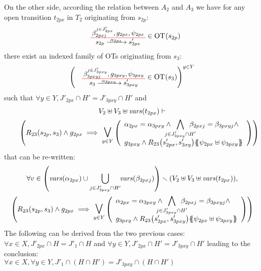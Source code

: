 \documentclass[runningheads]{llncs}
\begin{document}
\begin{enumerate}
On the other side, according the relation between $A_2$ and $A_3$ we have for any open transition $t_{2px}$ in $T_2$ originating from $s_{2p}$:
\begin{align*}
\OTx{2p}{x}{2px}{2px} \in \fOT{s_{2p}}
\end{align*}
there exist an indexed family of OTs originating from $s_3$: 
\begin{align*}
\mpar{\OTx{3}{pxy}{3pxy}{3pxy} \in \fOT{s_3}}^{y \in Y} 
\end{align*}
such that $\forall y \in Y, J'_{2px} \cap H' = J'_{3pxy} \cap H'$ and
\begin{multline*}
\everymath{\displaystyle}
V_2 \uplus V_3 \uplus \fvars{t_{2px}} \vdash\\\hspace{2em} \mpar{R_{23}\mpar{s_{2p}, s_{3}} \wedge g_{2px} \implies \operatorname*{\bigsymb{\bigvee}}_{y \in Y} \mpar{\everymath{\displaystyle}
\begin{array}{l}
			 \alpha_{2px}=\alpha_{3pxy} \wedge \bigwedge_\subbox{j \in J'_{3pxy} \cap H'} \beta_{2pxj}=\beta_{3pxyj} \nwedge \\
			g_{3pxy} \wedge R_{23}\mpar{s'_{2px}, s'_{3xy}}\psubst{\psi_{2px} \uplus \psi_{3pxy}}
		\end{array}}} 
\end{multline*}
that can be re-written:
\begin{multline*}
\everymath{\displaystyle}
\forall v\in \mpar{\fvars{\alpha_{2px}}  \cup \bigcup_{j \in J'_{3pxy}
\cap H'} \!\!\fvars{\beta_{2pxj}}} \setminus \mpar{V_2 \uplus V_3 \uplus \fvars{t_{2px}}},\\ \mpar{R_{23}\mpar{s_{2p}, s_{3}} \wedge g_{2px} \implies \operatorname*{\bigsymb{\bigvee}}_{y \in Y} \mpar{\everymath{\displaystyle}
\begin{array}{l}
			 \alpha_{2px}=\alpha_{3pxy} \wedge \bigwedge_\subbox{j \in J'_{3pxy} \cap H'} \beta_{2pxj}=\beta_{3pxyj} \nwedge\\
			 g_{3pxy} \wedge R_{23}\mpar{s'_{2px}, s'_{3pxy}}\psubst{\psi_{2px} \uplus \psi_{3pxy}}
		\end{array}}} 
\end{multline*}
The following  can be derived from the two previous cases: \\
$\forall x \in X, J'_{2px} \cap H = J'_1 \cap H$ and
$\forall y \in Y, J'_{2px} \cap H' = J'_{3pxy} \cap H'$ leading to the conclusion:\\
$\forall x \in X, \forall y \in Y,  J'_1 \cap (H \cap H') = J'_{3pxy} \cap (H\cap H')$ \\

\end{enumerate}
\end{document}
